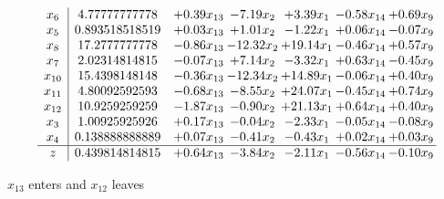 \documentclass[9pt]{article}
\begin{document}
 \[\begin{array}{c| c c@{\hskip 2pt} c@{\hskip 2pt} c@{\hskip 2pt} c@{\hskip 2pt} c@{\hskip 2pt} }
 x_{6}   &  4.77777777778 & +  0.39 x_{13} & -7.19 x_{2} & +  3.39 x_{1} & -0.58 x_{14} & +  0.69 x_{9}\\
 x_{5}   &  0.893518518519 & +  0.03 x_{13} & +  1.01 x_{2} & -1.22 x_{1} & +  0.06 x_{14} & -0.07 x_{9}\\
 x_{8}   &  17.2777777778 & -0.86 x_{13} & -12.32 x_{2} & + 19.14 x_{1} & -0.46 x_{14} & +  0.57 x_{9}\\
 x_{7}   &  2.02314814815 & -0.07 x_{13} & +  7.14 x_{2} & -3.32 x_{1} & +  0.63 x_{14} & -0.45 x_{9}\\
 x_{10}   &  15.4398148148 & -0.36 x_{13} & -12.34 x_{2} & + 14.89 x_{1} & -0.06 x_{14} & +  0.40 x_{9}\\
 x_{11}   &  4.80092592593 & -0.68 x_{13} & -8.55 x_{2} & + 24.07 x_{1} & -0.45 x_{14} & +  0.74 x_{9}\\
 x_{12}   &  10.9259259259 & -1.87 x_{13} & -0.90 x_{2} & + 21.13 x_{1} & +  0.64 x_{14} & +  0.40 x_{9}\\
 x_{3}   &  1.00925925926 & +  0.17 x_{13} & -0.04 x_{2} & -2.33 x_{1} & -0.05 x_{14} & -0.08 x_{9}\\
 x_{4}   &  0.138888888889 & +  0.07 x_{13} & -0.41 x_{2} & -0.43 x_{1} & +  0.02 x_{14} & +  0.03 x_{9}\\
\hline
z    &  0.439814814815 & +  0.64 x_{13} & -3.84 x_{2} & -2.11 x_{1} & -0.56 x_{14} & -0.10 x_{9}\\
\end{array}\]


 $ x_{13} $ enters and $ x_{12} $ leaves 
\end{document}
